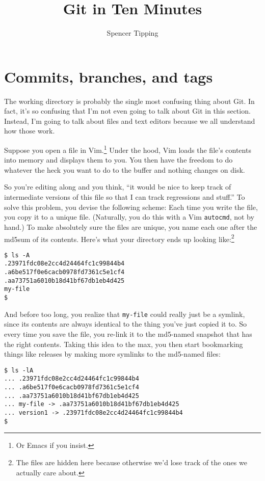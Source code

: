 \documentclass{article}
\title{Git in Ten Minutes}
\author{Spencer Tipping}
\begin{document}
\maketitle{}
\tableofcontents{}

\section{Commits, branches, and tags}
  The working directory is probably the single most confusing thing about Git. In fact, it's so confusing that I'm not even going to talk about Git in this section. Instead, I'm going to talk
  about files and text editors because we all understand how those work.

  Suppose you open a file in Vim.\footnote{Or Emacs if you insist.} Under the hood, Vim loads the file's contents into memory and displays them to you. You then have the freedom to do whatever
  the heck you want to do to the buffer and nothing changes on disk.

  So you're editing along and you think, ``it would be nice to keep track of intermediate versions of this file so that I can track regressions and stuff.'' To solve this problem, you devise
  the following scheme: Each time you write the file, you copy it to a unique file. (Naturally, you do this with a Vim {\tt autocmd}, not by hand.) To make absolutely sure the files are
  unique, you name each one after the md5sum of its contents. Here's what your directory ends up looking like:\footnote{The files are hidden here because otherwise we'd lose track of the ones
  we actually care about.}

\begin{verbatim}
$ ls -A
.23971fdc08e2cc4d24464fc1c99844b4
.a6be517f0e6cacb0978fd7361c5e1cf4
.aa73751a6010b18d41bf67db1eb4d425
my-file
$
\end{verbatim}

  And before too long, you realize that {\tt my-file} could really just be a symlink, since its contents are always identical to the thing you've just copied it to. So every time you save the
  file, you re-link it to the md5-named snapshot that has the right contents. Taking this idea to the max, you then start bookmarking things like releases by making more symlinks to the
  md5-named files:

\begin{verbatim}
$ ls -lA
... .23971fdc08e2cc4d24464fc1c99844b4
... .a6be517f0e6cacb0978fd7361c5e1cf4
... .aa73751a6010b18d41bf67db1eb4d425
... my-file -> .aa73751a6010b18d41bf67db1eb4d425
... version1 -> .23971fdc08e2cc4d24464fc1c99844b4
$
\end{verbatim}
\end{document}
